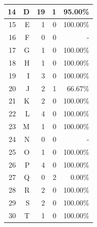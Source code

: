 \begin{longtable}[c]{|r|r|r|r|r|}
	14           & D                 & 19                       & 1                       &95.00\%            \\ \hline
	15           & E                 & 1                       & 0                       &100.00\%            \\ \hline
	16           & F                 & 0                       & 0                       & -            \\ \hline
	17           & G                 & 1                       & 0                       &100.00\%            \\ \hline
	18           & H                 & 1                       & 0                       &100.00\%            \\ \hline
	19           & I                 & 3                       & 0                       &100.00\%            \\ \hline
	20           & J                 & 2                       & 1                       &66.67\%            \\ \hline
	21           & K                 & 2                       & 0                       &100.00\%            \\ \hline
	22           & L                 & 4                       & 0                       &100.00\%            \\ \hline
	23           & M                 & 1                       & 0                       &100.00\%            \\ \hline
	24           & N                 & 0                       & 0                       & -            \\ \hline
	25           & O                 & 1                       & 0                       &100.00\%            \\ \hline
	26           & P                 & 4                       & 0                       &100.00\%            \\ \hline
	27           & Q                 & 0                       & 2                       &0.00\%            \\ \hline
	28           & R                 & 2                       & 0                       &100.00\%            \\ \hline
	29           & S                 & 2                       & 0                       &100.00\%            \\ \hline
	30           & T                 & 1                       & 0                       &100.00\%            \\ \hline

\end{longtable}
